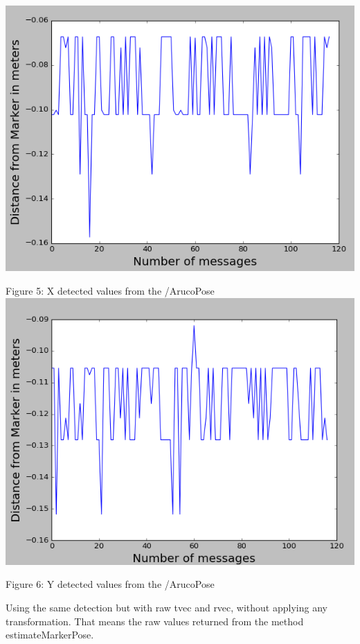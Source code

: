 \documentclass{article}
\begin{document}
\begin{center}
    \includegraphics[scale=0.5]{pictures/pic8.png}
    
    Figure 5: X detected values from the /ArucoPose
    \includegraphics[scale=0.5]{pictures/pic9.png}
    
    Figure 6: Y detected values from the /ArucoPose
\end{center}

Using the same detection but with raw tvec and rvec, without applying any transformation. That means the raw values returned from the method estimateMarkerPose.
\end{document}
